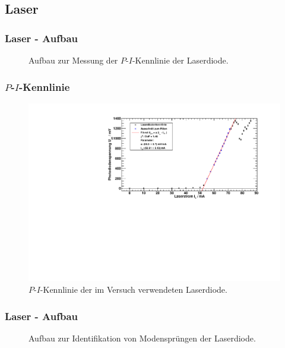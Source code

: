 
\subsection{Laser}



\begin{frame}
\frametitle{Laser - Aufbau}

\begin{figure}
    \centering
    \def\svgwidth{\textwidth}
    
    \caption{Aufbau zur Messung der $P$-$I$-Kennlinie der Laserdiode.}
\end{figure}

\end{frame}






\begin{frame}
\frametitle{$P$-$I$-Kennlinie}

\begin{figure}[H]
\begin{center}
  \includegraphics[width=\textwidth]{../img/diodenkennlinie.pdf}
  \caption{$P$-$I$-Kennlinie der im Versuch verwendeten Laserdiode.}
\end{center}
\end{figure}

\end{frame}


\begin{frame}
\frametitle{Laser - Aufbau}

\begin{figure}
    \centering
    \def\svgwidth{\textwidth}
    
    \caption{Aufbau zur Identifikation von Modensprüngen der Laserdiode.}
\end{figure}

\end{frame}


